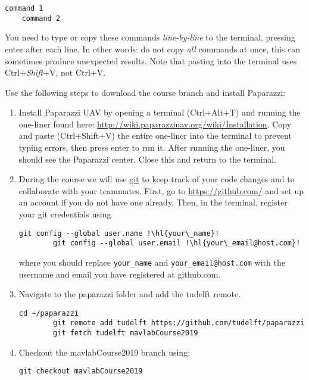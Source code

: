 \begin{lstlisting}[style=Bash]
	command 1
	command 2
\end{lstlisting}

You need to type or copy these commands \emph{line-by-line} to the terminal, pressing enter after each line. In other words: do not copy \emph{all} commands at once, this can sometimes produce unexpected results. Note that pasting into the terminal uses Ctrl+\emph{Shift}+V, not Ctrl+V.

Use the following steps to download the course branch and install Paparazzi:

\begin{enumerate}
	\item{Install Paparazzi UAV by opening a terminal (Ctrl+Alt+T) and running the one-liner found here: \url{http://wiki.paparazziuav.org/wiki/Installation}. Copy and paste (Ctrl+Shift+V) the entire one-liner into the terminal to prevent typing errors, then press enter to run it. After running the one-liner, you should see the Paparazzi center. Close this and return to the terminal.}
	
	\item{During the course we will use \href{https://git-scm.com/}{git} to keep track of your code changes and to collaborate with your teammates. First, go to \url{https://github.com/} and set up an account if you do not have one already. Then, in the terminal, register your git credentials using
	\begin{lstlisting}[style=Bash]
		git config --global user.name !\hl{your\_name}!
		git config --global user.email !\hl{your\_email@host.com}!
	\end{lstlisting}
	where you should replace \texttt{your\_name} and \texttt{your\_email@host.com} with the username and email you have registered at github.com.}
	
	\item Navigate to the paparazzi folder and add the tudelft remote.
	\begin{lstlisting}[style=Bash]
		cd ~/paparazzi
		git remote add tudelft https://github.com/tudelft/paparazzi
		git fetch tudelft mavlabCourse2019
	\end{lstlisting}
	
	\item Checkout the mavlabCourse2019 branch using:
	\begin{lstlisting}[style=Bash]
		git checkout mavlabCourse2019
	\end{lstlisting}
	

\end{enumerate}
